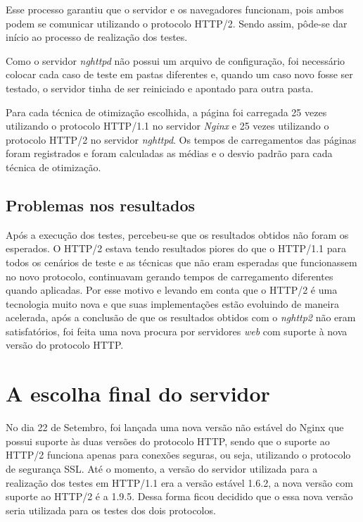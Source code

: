Esse processo garantiu que o servidor e os navegadores funcionam, pois ambos podem se comunicar utilizando o protocolo HTTP/2. Sendo assim, pôde-se dar início ao processo de realização dos testes.

Como o servidor \textit{nghttpd} não possui um arquivo de configuração, foi necessário colocar cada caso de teste em pastas diferentes e, quando um caso novo fosse ser testado, o servidor tinha de ser reiniciado e apontado para outra pasta.

Para cada técnica de otimização escolhida, a página foi carregada 25 vezes utilizando o protocolo HTTP/1.1 no servidor \textit{Nginx} e 25 vezes utilizando o protocolo HTTP/2 no servidor \textit{nghttpd}. Os tempos de carregamentos das páginas foram registrados e foram calculadas as médias e o desvio padrão para cada técnica de otimização.

\subsection{Problemas nos resultados}
\label{problemasnosresultados}

Após a execução dos testes, percebeu-se que os resultados obtidos não foram os esperados. O HTTP/2 estava tendo resultados piores do que o HTTP/1.1 para todos os cenários de teste e as técnicas que não eram esperadas que funcionassem no novo protocolo, continuavam gerando tempos de carregamento diferentes quando aplicadas. Por esse motivo e levando em conta que o HTTP/2 é uma tecnologia muito nova e que suas implementações estão evoluindo de maneira acelerada, após a conclusão de que os resultados obtidos com o \textit{nghttp2} não eram satisfatórios, foi feita uma nova procura por servidores \textit{web} com suporte à nova versão do protocolo HTTP.

\section{A escolha final do servidor}
\label{aescolhafinaldoservidor}


No dia 22 de Setembro, foi lançada uma nova versão não estável do Nginx que possui suporte às duas versões do protocolo HTTP, sendo que o suporte ao HTTP/2 funciona apenas para conexões seguras, ou seja, utilizando o protocolo de segurança SSL. Até o momento, a versão do servidor utilizada para a realização dos testes em HTTP/1.1 era a versão estável 1.6.2, a nova versão com suporte ao HTTP/2 é a 1.9.5. Dessa forma ficou decidido que o essa nova versão seria utilizada para os testes dos dois protocolos.

